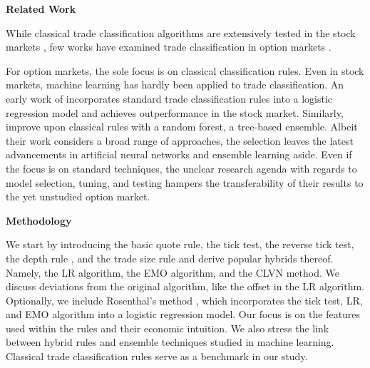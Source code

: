 \textbf{Related Work}

While classical trade classification algorithms are extensively tested in the stock markets \autocites[e.~g.,][]{chakrabartyTradeClassificationAlgorithms2012}{odders-whiteOccurrenceConsequencesInaccurate2000}, few works have examined trade classification in option markets \autocites{grauerOptionTradeClassification2022}{savickasInferringDirectionOption2003}.

For option markets, the sole focus is on classical classification rules. Even in stock markets, machine learning has hardly been applied to trade classification. An early work of \textcite{rosenthalModelingTradeDirection2012} incorporates standard trade classification rules into a logistic regression model and achieves outperformance in the stock market. Similarly, \textcites{fedeniaMachineLearningCorporate2021}{ronenMachineLearningTrade2022} improve upon classical rules with a random forest, a tree-based ensemble. Albeit their work considers a broad range of approaches, the selection leaves the latest advancements in artificial neural networks and ensemble learning aside. Even if the focus is on standard techniques, the unclear research agenda with regards to model selection, tuning, and testing hampers the transferability of their results to the yet unstudied option market. 

\textbf{Methodology}

We start by introducing the basic quote rule, the tick test, the reverse tick test, the depth rule \autocite{grauerOptionTradeClassification2022}, and the trade size rule \autocite{grauerOptionTradeClassification2022} and derive popular hybrids thereof. Namely, the \gls{LR} algorithm, the \gls{EMO} algorithm, and the  \gls{CLVN} method. We discuss deviations from the original algorithm, like the offset in the \gls{LR} algorithm. Optionally, we include Rosenthal's method \autocite{rosenthalModelingTradeDirection2012}, which incorporates the tick test, \gls{LR}, and \gls{EMO} algorithm into a logistic regression model. Our focus is on the features used within the rules and their economic intuition. We also stress the link between hybrid rules and ensemble techniques studied in machine learning. Classical trade classification rules serve as a benchmark in our study.

